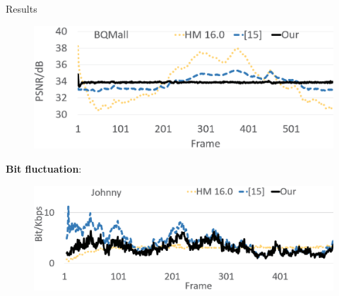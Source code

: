 \documentclass[final]{beamer}
\newlength{\onecolwid}
\begin{document}
\begin{frame}[t]
\begin{columns}[t]
\begin{column}{\onecolwid}
\begin{block}{Results}
\begin{figure}
\begin{center}
\label{figurebitfluctuation}
\end{center}
\end{figure}
\begin{figure}
\begin{center}
    \includegraphics[width=.90\linewidth]{Figures/rs4.eps}
\label{figurebitfluctuation}
\end{center}
\end{figure}
\textbf{Bit fluctuation}:
\begin{figure}
\begin{center}
    \includegraphics[width=.90\linewidth]{Figures/rsb1.eps}
\label{figurebitfluctuation}
\end{center}
\end{figure}

\end{block}


%
%


\end{column}
\end{columns}
\end{frame}
\end{document}
